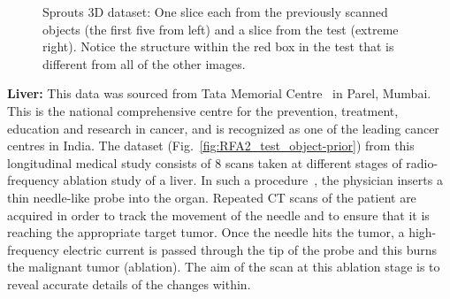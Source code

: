 \documentclass[journal]{IEEEtran}
\begin{document}
\begin{figure}[!h]
\begin{subfigure}[b]{0.29\linewidth}
\captionsetup{labelformat=empty}
        \caption{}
     \end{subfigure}
      \caption{Sprouts 3D dataset: One slice each from the previously scanned objects (the first five from left) and a slice from the test (extreme
        right). Notice the structure within the red box in the test that is different from all of the other images.}
\label{fig:object-prior_test_sprouts}
\addtolength{\textfloatsep}{-0.8cm}
\end{figure}

\textbf{Liver:} %
This data was sourced from Tata Memorial Centre~\cite{tmh} in Parel,
Mumbai.  This is the national comprehensive centre for the prevention,
treatment, education and research in cancer, and is recognized as one
of the leading cancer centres in India. The dataset
(Fig.~\ref{fig:RFA2_test_object-prior}) from this longitudinal medical
study consists of 8 scans taken at different stages of radio-frequency
ablation study of a liver. In such a procedure~\cite{Dong2015}, the
physician inserts a thin needle-like probe into the organ. Repeated CT
scans of the patient are acquired in order to track the movement of
the needle and to ensure that it is reaching the appropriate target
tumor. Once the needle hits the tumor, a high-frequency electric
current is passed through the tip of the probe and this burns the
malignant tumor (ablation). The aim of the scan at this ablation stage
is to reveal accurate details of the changes within.
\end{document}
